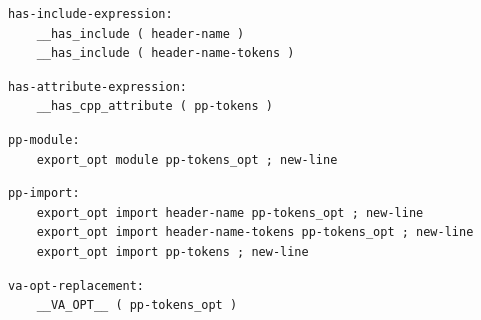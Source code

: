 \noindent\textbf{\texttt{}}\par
\begin{lstlisting}
has-include-expression:
    __has_include ( header-name )
    __has_include ( header-name-tokens )
\end{lstlisting}

\noindent\textbf{\texttt{}}\par
\begin{lstlisting}
has-attribute-expression:
    __has_cpp_attribute ( pp-tokens )
\end{lstlisting}

\noindent\textbf{\texttt{}}\par
\begin{lstlisting}
pp-module:
    export_opt module pp-tokens_opt ; new-line
\end{lstlisting}

\noindent\textbf{\texttt{}}\par
\begin{lstlisting}
pp-import:
    export_opt import header-name pp-tokens_opt ; new-line
    export_opt import header-name-tokens pp-tokens_opt ; new-line
    export_opt import pp-tokens ; new-line
\end{lstlisting}

\noindent\textbf{\texttt{}}\par
\begin{lstlisting}
va-opt-replacement:
    __VA_OPT__ ( pp-tokens_opt )
\end{lstlisting}

